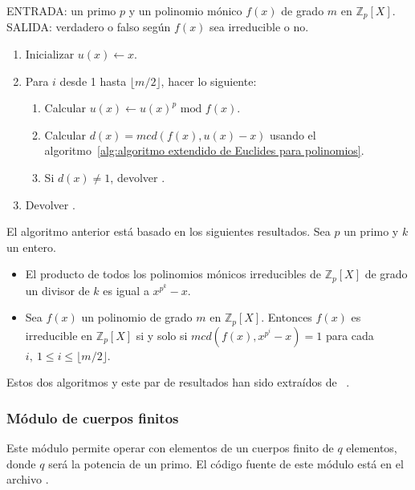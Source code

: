\begin{algoritmo2}
    ENTRADA: un primo $p$ y un polinomio mónico $f(x)$ de grado $m$ en $\mathbb{Z}_p[X]$. \\
    SALIDA: verdadero o falso según $f(x)$ sea irreducible o no.
    \begin{enumerate}
        \item Inicializar $u(x) \leftarrow x$.
        \item Para $i$ desde 1 hasta $\lfloor m/2 \rfloor$, hacer lo siguiente:
            \begin{enumerate}
                \item Calcular $u(x) \leftarrow u(x)^p \textrm{ mod } f(x)$.
                \item Calcular $d(x) = mcd(f(x), u(x) - x)$ usando el algoritmo~\ref{alg:algoritmo extendido de Euclides para polinomios}.
                \item Si $d(x) \neq 1$, devolver .
            \end{enumerate}
        \item Devolver .
    \end{enumerate}
\end{algoritmo2}
\begin{nota}
    El algoritmo anterior está basado en los siguientes resultados. Sea $p$ un primo y $k$ un entero.
    \begin{itemize}
        \item El producto de todos los polinomios mónicos irreducibles de $\mathbb{Z}_p[X]$ de grado un divisor de $k$ es igual a $x^{p^k} - x$.
        \item Sea $f(x)$ un polinomio de grado $m$ en $\mathbb{Z}_p[X]$. Entonces $f(x)$ es irreducible en $\mathbb{Z}_p[X]$ si y solo si $mcd(f(x), x^{p^i} - x) = 1$ para cada $i, \ 1 \le i \le \lfloor m/2 \rfloor$.
    \end{itemize}
\end{nota}
Estos dos algoritmos y este par de resultados han sido extraídos de~ \cite{Menezes:1996}.

\subsubsection{Módulo de cuerpos finitos}
\label{subs:Módulo de cuerpos finitos}

Este módulo permite operar con elementos de un cuerpos finito de $q$ elementos, donde $q$ será la potencia de un primo. El código fuente de este módulo está en el archivo .

